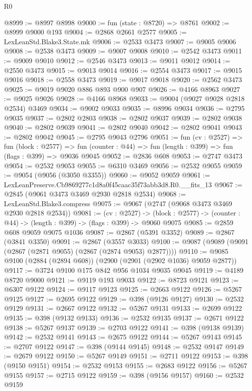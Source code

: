 \begin{lexlean}{R0}
\begin{coremodule}
@8999 := @8997 @8998
@9000 := fun (state : @8720) => @8761
@9002 := @8999 @9000 @193
@9004 := @2868 @2661 @2577
@9005 := LexLeanStd.Blake3.State.mk
@9006 := @2533 @3473
@9007 := @9005 @9006
@9008 := @2538 @3473
@9009 := @9007 @9008
@9010 := @2542 @3473
@9011 := @9009 @9010
@9012 := @2546 @3473
@9013 := @9011 @9012
@9014 := @2550 @3473
@9015 := @9013 @9014
@9016 := @2554 @3473
@9017 := @9015 @9016
@9018 := @2558 @3473
@9019 := @9017 @9018
@9020 := @2562 @3473
@9025 := @9019 @9020 @886 @893 @900 @907
@9026 := @4166 @8963
@9027 := @9025 @9026
@9028 := @4166 @8968
@9033 := @9004 (@9027 @9028 @2818 @2534) @3469
@9034 := @9002 @9033
@9035 := @8996 @9034
@9036 := @2795 @9035
@9037 := @2802 @2803
@9038 := @2802 @9037
@9039 := @2802 @9038
@9040 := @2802 @9039
@9041 := @2802 @9040
@9042 := @2802 @9041
@9043 := @2802 @9042
@9045 := @2795 @9043 @2796
@9051 := fun (cv : @2527) =>
  fun (block : @2577) =>
  fun (counter : @44) => fun (length : @399) => fun (flags : @399) => @9036 @9045
@9052 := @2836 @608
@9053 := @2747 @3473
@9054 := @2532 @9053
@9055 := @6310 @3469
@9056 := @2532 @9055
@9059 := @9054 (@9056 (@3050 @3355))
@9060 := @9052 @9059
@9061 := LexLeanPreserve.Cb9869277c1d8a0f45caac35f73abb3d8.R0.__fits_13
@9067 := @2845 (@9061 @3473 @3469 @2930 @2818 @2534)
@9068 := LexLeanStd.Blake3.compress
@9075 := @9067 (@2747 (@9068 @3473 @3469 @2930 @2818 @2534))
@9081 := (cv : @2527) ->
  (block : @2577) -> (counter : @44) -> (length : @399) -> (flags : @399) -> @9060 @9075
@9085 := @2859 @608 @9059 @9075 @1036
@9087 := @2867 (@5391 @3352)
@9089 := @2867 (@3841 @3350)
@9091 := @2867 (@3557 @3033)
@9100 := @9087 (@9089 (@9091 (@2867 (@2871 @9055) (@2867 (@2874 @9053) @2877))))
@9110 := @9085 @9100 (@2884 (@2894 @608)) (@2900 (@2901 (@2902 @1036) @9059 @2877))
@9117 := @3724 @9100 @175 @842 @956 @1034 @9035 @9045
@9119 := @4189 @8720 @9000
@9121 := @9119 @193 @9033
@9122 := @8723 @9121
@9123 := @6307 @9122
@9124 := @9117 @9123
@9125 := @2663 @9122
@9126 := @5267 @9125
@9127 := @2695 @9122
@9129 := @398 (@9126 @9127)
@9130 := @2532 @9129
@9131 := @2667 @9122
@9132 := @5267 @9131
@9133 := @2699 @9122
@9135 := @398 (@9132 @9133)
@9136 := @2532 @9135
@9137 := @2671 @9122
@9138 := @5267 @9137
@9139 := @2703 @9122
@9141 := @398 (@9138 @9139)
@9142 := @2532 @9141
@9143 := @2675 @9122
@9144 := @5267 @9143
@9145 := @2707 @9122
@9147 := @398 (@9144 @9145)
@9148 := @2532 @9147
@9149 := @2679 @9122
@9150 := @5267 @9149
@9151 := @2711 @9122
@9153 := @398 (@9150 @9151)
@9154 := @2532 @9153
@9155 := @2683 @9122
@9156 := @5267 @9155
@9157 := @2715 @9122
@9159 := @398 (@9156 @9157)
@9160 := @2532 @9159

\end{coremodule}
\end{lexlean}
